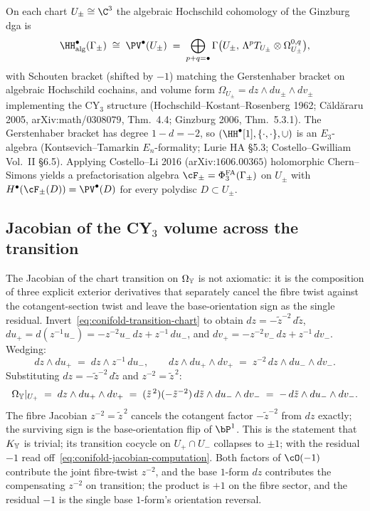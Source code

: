 \begin{theorem}
\label{thm:conifold-chart-hkr}
On each chart $U_\pm \cong \C^3$ the algebraic Hochschild cohomology of the Ginzburg dga is
\[
 \HH^\bullet_{\mathrm{alg}}(\Gamma_\pm) \;\cong\; \PV^\bullet(U_\pm) \;=\; \bigoplus_{p+q=\bullet} \Gamma\bigl(U_\pm,\, \Lambda^p T_{U_\pm} \otimes \Omega^{0,q}_{U_\pm}\bigr),
\]
with Schouten bracket (shifted by $-1$) matching the Gerstenhaber bracket on algebraic Hochschild cochains, and volume form $\Omega_{U_\pm} = dz \wedge du_\pm \wedge dv_\pm$ implementing the CY$_3$ structure (Hochschild--Kostant--Rosenberg 1962; C\u ald\u araru 2005, arXiv:math/$0308079$, Thm.~4.4; Ginzburg 2006, Thm.~5.3.1). The Gerstenhaber bracket has degree $1 - d = -2$, so $(\HH^\bullet[1], \{\cdot, \cdot\}, \cup)$ is an $E_3$-algebra (Kontsevich--Tamarkin $E_n$-formality; Lurie HA §5.3; Costello--Gwilliam Vol.~II §6.5). Applying Costello--Li 2016 (arXiv:$1606.00365$) holomorphic Chern--Simons yields a prefactorisation algebra $\cF_\pm = \PhiFA_3(\Gamma_\pm)$ on $U_\pm$ with $H^\bullet(\cF_\pm(D)) = \PV^\bullet(D)$ for every polydisc $D \subset U_\pm$.
\end{theorem}

\subsection{Jacobian of the CY\texorpdfstring{$_3$}{-3} volume across the transition}
\label{subsec:conifold-jacobian}

The Jacobian of the chart transition on $\Omega_{\mathbb{Y}}$ is not axiomatic: it is the composition of three explicit exterior derivatives that separately cancel the fibre twist against the cotangent-section twist and leave the base-orientation sign as the single residual. Invert~\eqref{eq:conifold-transition-chart} to obtain $dz = -\tilde z^{-2}\,d\tilde z$, $du_+ = d(z^{-1} u_-) = -z^{-2} u_-\,dz + z^{-1}\,du_-$, and $dv_+ = -z^{-2} v_-\,dz + z^{-1}\,dv_-$. Wedging:
\[
 dz \wedge du_+ \;=\; dz \wedge z^{-1}\, du_-,
 \qquad
 dz \wedge du_+ \wedge dv_+ \;=\; z^{-2}\, dz \wedge du_- \wedge dv_-.
\]
Substituting $dz = -\tilde z^{-2}\,d\tilde z$ and $z^{-2} = \tilde z^{\,2}$:
\begin{equation}\label{eq:conifold-jacobian-computation}
 \Omega_{\mathbb{Y}}|_{U_+} \;=\; dz \wedge du_+ \wedge dv_+
 \;=\; (\tilde z^{\,2})(-\tilde z^{-2})\,d\tilde z \wedge du_- \wedge dv_-
 \;=\; -\,d\tilde z \wedge du_- \wedge dv_-.
\end{equation}
The fibre Jacobian $z^{-2} = \tilde z^{\,2}$ cancels the cotangent factor $-\tilde z^{-2}$ from $dz$ exactly; the surviving sign is the base-orientation flip of $\bP^1$. This is the statement that $K_{\mathbb{Y}}$ is trivial; its transition cocycle on $U_+ \cap U_-$ collapses to $\pm 1$; with the residual $-1$ read off~\eqref{eq:conifold-jacobian-computation}. Both factors of $\cO(-1)$ contribute the joint fibre-twist $z^{-2}$, and the base $1$-form $dz$ contributes the compensating $z^{-2}$ on transition; the product is $+1$ on the fibre sector, and the residual $-1$ is the single base $1$-form's orientation reversal.

